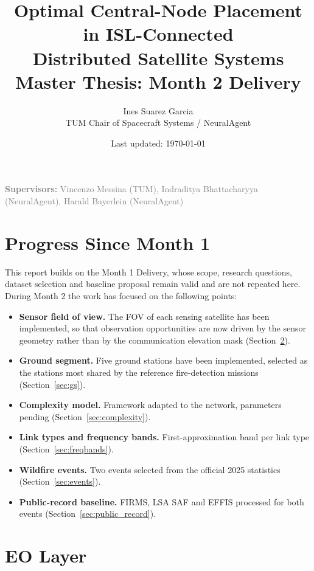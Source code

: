 \documentclass[11pt]{article}
\title{\textbf{Optimal Central-Node Placement in ISL-Connected \\ Distributed Satellite Systems} \\[0.3cm] \large Master Thesis: Month 2 Delivery}
\author{Ines Suarez Garcia \\ TUM Chair of Spacecraft Systems / NeuralAgent}
\date{Last updated: \today}
\begin{document}
\maketitle

\begin{center}
\textcolor{gray}{\textbf{Supervisors:} Vincenzo Messina (TUM), Indraditya Bhattacharyya (NeuralAgent), Harald Bayerlein (NeuralAgent)}
\end{center}

\vspace{0.5cm}

\section{Progress Since Month 1}

This report builds on the Month 1 Delivery, whose scope, research questions, dataset selection and baseline proposal remain valid and are not repeated here. During Month 2 the work has focused on the following points:
\begin{itemize}[leftmargin=1.2cm]
    \item \textbf{Sensor field of view.} The FOV of each sensing satellite has been implemented, so that observation opportunities are now driven by the sensor geometry rather than by the communication elevation mask (Section~\ref{sec:eo}).
    \item \textbf{Ground segment.} Five ground stations have been implemented, selected as the stations most shared by the reference fire-detection missions (Section~\ref{sec:gs}).
    \item \textbf{Complexity model.} Framework adapted to the network, parameters pending (Section~\ref{sec:complexity}).
    \item \textbf{Link types and frequency bands.} First-approximation band per link type (Section~\ref{sec:freqbands}).
    \item \textbf{Wildfire events.} Two events selected from the official 2025 statistics (Section~\ref{sec:events}).
    \item \textbf{Public-record baseline.} FIRMS, LSA SAF and EFFIS processed for both events (Section~\ref{sec:public_record}).
\end{itemize}

\section{EO Layer}\label{sec:eo}
\end{document}
